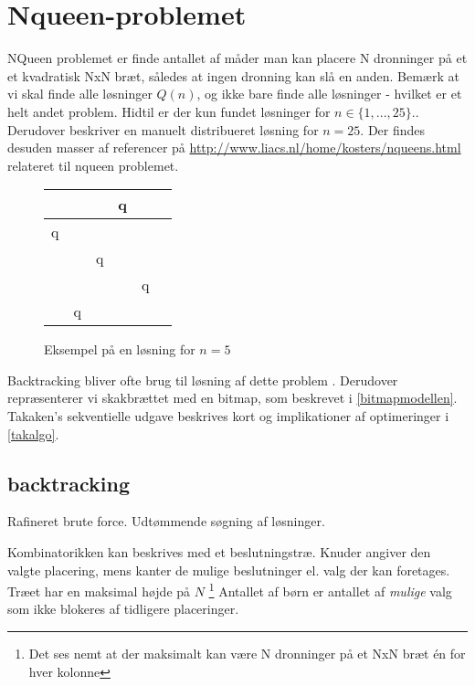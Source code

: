 \documentclass[draft,a4paper,10pt]{article}
\def\chs#1{{\chessfont#1}}
\begin{document}
\section{Nqueen-problemet}\label{nqueenproblemet}

NQueen problemet er finde antallet af måder man kan placere N dronninger på et et kvadratisk NxN bræt, således at ingen dronning kan slå en anden. Bemærk at vi skal finde alle løsninger $Q(n)$, og ikke bare finde alle løsninger - hvilket er et helt andet problem. Hidtil er der kun fundet løsninger for $n \in \{1,...,25\}$.\cite{sekvenser}. Derudover beskriver \cite{etsi} en manuelt distribueret løsning for $n=25$. Der findes desuden masser af referencer på \url{http://www.liacs.nl/home/kosters/nqueens.html} relateret til nqueen problemet. 

\begin{figure}
\begin{center}
\begin{tabular}{|c|c|c|c|c|c}
\hline	 &  & &   \chs{q} & \\
\hline	\chs{q} & &  &  & \\
\hline	 & & \chs{q} &  &  \\
\hline	 &  &  & & \chs{q} \\
\hline	 & \chs{q} & &  &  \\
\hline
\end{tabular}
\end{center}
\caption{Eksempel på en løsning for $n=5$}
\end{figure}

Backtracking bliver ofte brug til løsning af dette problem . Derudover repræsenterer vi skakbrættet med en bitmap, som beskrevet i \ref{bitmapmodellen}. Takaken's sekventielle udgave beskrives kort og implikationer af optimeringer i \ref{takalgo}.

\subsection{backtracking}

Rafineret brute force. Udtømmende søgning af løsninger.


Kombinatorikken kan beskrives med et beslutningstræ. Knuder angiver den valgte placering, mens kanter de mulige beslutninger el. valg der kan foretages.  Træet har en maksimal højde på $N$ \footnote{Det ses nemt at der maksimalt kan være N dronninger på et NxN bræt én for hver kolonne}
Antallet af børn er antallet af \textit{mulige} valg som ikke blokeres af tidligere placeringer. 
\end{document}
